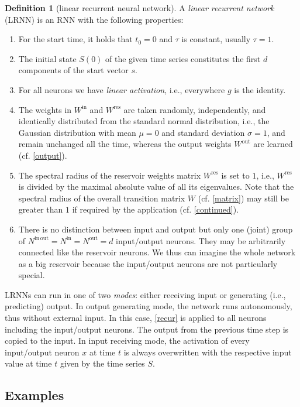 \documentclass[preprint,12pt,times,authoryear]{elsarticle}%
\theoremstyle{definition}
\newtheorem{defn}{Definition}
\begin{document}
\begin{defn}[linear recurrent neural network]\label{thedef}
A \emph{linear recurrent network} (LRNN) is an RNN with the
following properties:
\begin{enumerate}
  \item For the start time, it holds that $t_0=0$ and $\tau$ is constant, usually $\tau=1$.
  \item The initial state $S(0)$ of the given time series constitutes the first
	$d$ components of the start vector $s$.
  \item For all neurons we have \emph{linear activation}, i.e., everywhere $g$
	is the identity.
  \item The weights in $W^\mathrm{in}$ and $W^\mathrm{res}$ are taken
	randomly, independently, and identically distributed from the standard
	normal distribution, i.e., the Gaussian distribution with mean $\mu = 0$
	and standard deviation $\sigma = 1$, and remain unchanged all the time,
	whereas the output weights $W^\mathrm{out}$ are learned (cf. \cref{output}).
  \item The spectral radius of the reservoir weights matrix $W^\mathrm{res}$ is
	set to $1$, i.e., $W^\mathrm{res}$ is divided by the maximal absolute
	value of all its eigenvalues. Note that the spectral radius of the
	overall transition matrix $W$ (cf. \cref{matrix}) may still be greater
	than $1$ if required by the application (cf. \cref{continued}).
  \item There is no distinction between input and output but only one (joint)
	group of $N^\mathrm{in\,out} = N^\mathrm{in}=N^\mathrm{out}=d$ input/output neurons. They may
	be arbitrarily connected like the reservoir neurons. We thus can imagine
	the whole network as a big reservoir because the input/output neurons
	are not particularly special.
\end{enumerate}
\end{defn}

LRNNs can run in one of two \emph{modes}: either receiving input or generating
(i.e., predicting) output. In output generating mode, the network runs
autonomously, thus without external input. In this case, \cref{recur} is applied
to all neurons including the input/output neurons. The output from the
previous time step is copied to the input. In input receiving mode, the
activation of every input/output neuron $x$ at time $t$ is always overwritten
with the respective input value at time $t$ given by the time series $S$.

\subsection{Examples}
\end{document}
